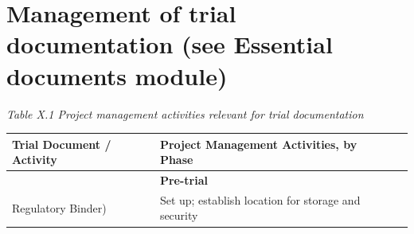 \documentclass[]{book}
\begin{document}
\section{Management of trial documentation (see Essential documents
module)}\label{management-of-trial-documentation-see-essential-documents-module}

\emph{Table X.1 Project management activities relevant for trial
documentation}

\begin{longtable}[]{@{}llll@{}}
\toprule
\begin{minipage}[b]{0.08\columnwidth}\raggedright\strut
Trial Document / Activity\strut
\end{minipage} & \begin{minipage}[b]{0.28\columnwidth}\raggedright\strut
Project Management Activities, by Phase\strut
\end{minipage} & \begin{minipage}[b]{0.35\columnwidth}\raggedright\strut
\strut
\end{minipage} & \begin{minipage}[b]{0.17\columnwidth}\raggedright\strut
\strut
\end{minipage}\tabularnewline
\midrule
\endhead
\begin{minipage}[t]{0.08\columnwidth}\raggedright\strut
\strut
\end{minipage} & \begin{minipage}[t]{0.28\columnwidth}\raggedright\strut
\textbf{Pre-trial}\strut
\end{minipage} & \begin{minipage}[t]{0.35\columnwidth}\raggedright\strut
\strut
\end{minipage} & \begin{minipage}[t]{0.17\columnwidth}\raggedright\strut
\strut
\end{minipage}\tabularnewline
\begin{minipage}[t]{0.08\columnwidth}\raggedright\strut
Regulatory Binder)\strut
\end{minipage} & \begin{minipage}[t]{0.28\columnwidth}\raggedright\strut
Set up; establish location for storage and security\strut
\end{minipage} & \begin{minipage}[t]{0.35\columnwidth}\raggedright\strut
\strut
\end{minipage} & \begin{minipage}[t]{0.17\columnwidth}\raggedright\strut

\end{minipage}
\end{longtable}
\end{document}
